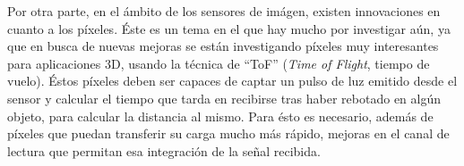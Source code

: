 Por otra parte, en el ámbito de los sensores de imágen, existen innovaciones en
cuanto a los píxeles. Éste es un tema en el que hay mucho por investigar aún, ya
que en busca de nuevas mejoras se están investigando píxeles muy interesantes para
aplicaciones 3D, usando la técnica de ``ToF'' (\textit{Time of Flight},
tiempo de vuelo)\cite{Portaluppi2018}\cite{Payne2014}.
Éstos píxeles deben ser capaces de captar un pulso de luz emitido desde el sensor
y calcular el tiempo que tarda en recibirse tras haber rebotado en algún objeto,
para calcular la distancia al mismo. Para ésto es necesario, además de píxeles
que puedan transferir su carga mucho más rápido, mejoras en el canal de lectura
que permitan esa integración de la señal recibida.\\
